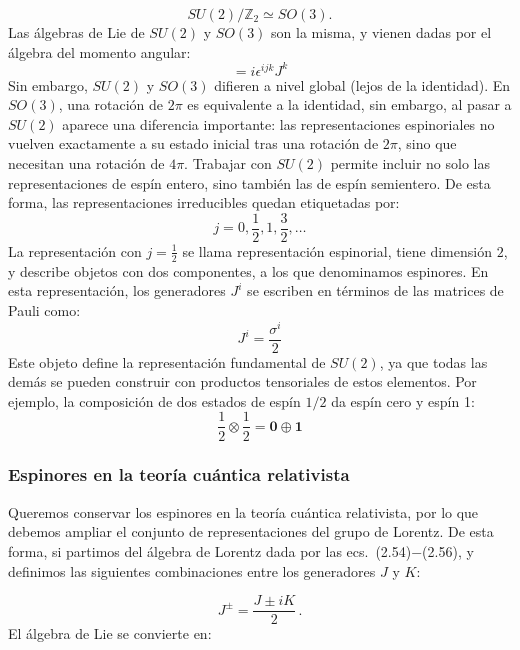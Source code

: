 \documentclass[a4paper,11pt]{book} %
\begin{document}
\begin{equation}
SU(2)/\mathbb{Z}_2
\simeq
SO(3).
\end{equation}
\medskip\newline
Las álgebras de Lie de $SU(2)$ y $SO(3)$ son la misma, y vienen dadas por el álgebra del momento angular:
\begin{equation}
[J^{i},J^{j}]=i\epsilon^{ijk}J^{k}
\end{equation}
\noindent
Sin embargo, $SU(2)$ y $SO(3)$ difieren a nivel global (lejos de la identidad). En $SO(3)$, una rotación de $2\pi$ es equivalente a la identidad, sin embargo, al pasar a $SU(2)$ aparece una diferencia importante: las representaciones espinoriales no vuelven exactamente a su estado inicial tras una rotación de $2\pi$, sino que necesitan una rotación de $4\pi$.
\medskip\newline
Trabajar con $SU(2)$ permite incluir no solo las representaciones de espín entero, sino también las de espín semientero. De esta forma, las representaciones irreducibles quedan etiquetadas por:
\[
j = 0,\frac{1}{2},1,\frac{3}{2},\dots
\]
La representación con $j=\frac{1}{2}$ se llama representación espinorial, tiene dimensión $2$, y describe objetos con dos componentes, a los que denominamos espinores. En esta representación, los generadores $J^i$ se escriben en términos de las matrices de Pauli como:
\begin{equation}
J^{i}=\frac{\sigma^{i}}{2}
\end{equation}
\noindent
Este objeto define la representación fundamental de $SU(2)$, ya que todas las demás se pueden construir con productos tensoriales de estos elementos. Por ejemplo, la composición de dos estados de espín $1/2$ da espín cero y espín 1:
\begin{equation}
\frac{1}{2}\otimes\frac{1}{2}=\mathbf{0}\oplus\mathbf{1}
\end{equation}

\subsubsection{Espinores en la teoría cuántica relativista}
\noindent
Queremos conservar los espinores en la teoría cuántica relativista, por lo que debemos ampliar el conjunto de representaciones del grupo de Lorentz. De esta forma, si partimos del álgebra de Lorentz dada por las ecs.~(2.54)$-$(2.56), y definimos las siguientes combinaciones entre los generadores $J$ y $K$:
 
\begin{equation}
{J}^{\pm} = \frac{{J} \pm i{K}}{2} \, .
\end{equation}
 \noindent
El álgebra de Lie se convierte en:
 
\end{document}
